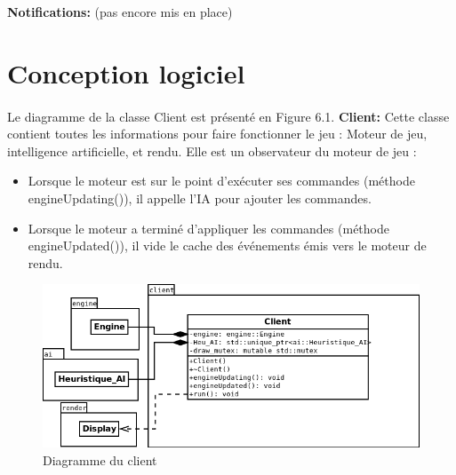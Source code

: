 \documentclass[12pt]{report}
\begin{document}
\paragraphe{}\textbf{Notifications:} (pas encore mis en place)

\section{Conception logiciel}
\paragraph{}Le diagramme de la classe Client est présenté en Figure 6.1.
\newline
\paragraphe{}\textbf{Client:} Cette classe  contient toutes les informations pour faire fonctionner le jeu : Moteur de jeu, intelligence artiﬁcielle, et rendu. Elle est un observateur du moteur de jeu : 
\begin{itemize}
    \item Lorsque le moteur est sur le point d’exécuter ses commandes (méthode engineUpdating()), il appelle l'IA pour ajouter les commandes.
    \item Lorsque le moteur a terminé d’appliquer les commandes (méthode engineUpdated()), il vide le cache des événements émis vers le moteur de rendu.
\end{itemize}

\newpage
\thispagestyle{empty}
\begin{landscape}
\begin{figure}[h]
    \begin{center}
    \includegraphics[scale=0.80]{client.png}
    \end{center}
    \caption{Diagramme du client}
\end{figure}
\end{landscape}
\end{document}
